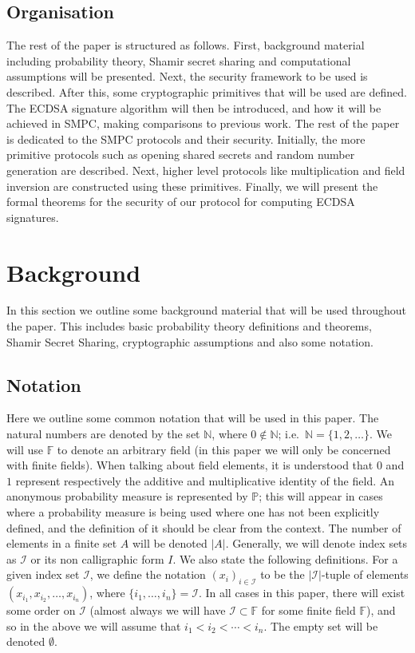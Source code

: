 \documentclass{article}
\newcommand\paper{paper}
\theoremstyle{remark}
\newcommand{\N}{\mathbb{N}}
\newcommand{\F}{\mathbb{F}}
\renewcommand{\P}{\mathbb{P}}
\begin{document}
\subsection{Organisation}

The rest of the \paper{} is structured as follows. First, background material
including probability theory, Shamir secret sharing and computational
assumptions will be presented. Next, the security framework to be used is
described. After this, some cryptographic primitives that will be used are
defined. The ECDSA signature algorithm will then be introduced, and how it will
be achieved in SMPC, making comparisons to previous work. The rest of the paper
is dedicated to the SMPC protocols and their security. Initially, the more
primitive protocols such as opening shared secrets and random number generation
are described. Next, higher level protocols like multiplication and field
inversion are constructed using these primitives. Finally, we will present the
formal theorems for the security of our protocol for computing ECDSA
signatures.

\section{Background}

In this section we outline some background material that will be used
throughout the \paper{}. This includes basic probability theory definitions and
theorems, Shamir Secret Sharing, cryptographic assumptions and also some
notation.

\subsection{Notation}

Here we outline some common notation that will be used in this \paper{}. The
natural numbers are denoted by the set $\N$, where $0 \notin \N$; i.e.\ $\N =
\{1, 2, \ldots\}$. We will use $\F$ to denote an arbitrary field (in this
\paper{} we will only be concerned with finite fields). When talking about
field elements, it is understood that $0$ and $1$ represent respectively the
additive and multiplicative identity of the field. An anonymous probability
measure is represented by $\P$; this will appear in cases where a probability
measure is being used where one has not been explicitly defined, and the
definition of it should be clear from the context. The number of elements in a
finite set $A$ will be denoted $|A|$. Generally, we will denote index sets as
$\mathcal{I}$ or its non calligraphic form $I$. We also state the following
definitions. For a given index set $\mathcal{I}$, we define the notation
${(x_i)}_{i \in \mathcal{I}}$ to be the $|\mathcal{I}|$-tuple of elements
$(x_{i_1}, x_{i_2}, \ldots, x_{i_n})$, where $\{i_1, \ldots, i_n\} =
\mathcal{I}$. In all cases in this \paper{}, there will exist some order on
$\mathcal{I}$ (almost always we will have $\mathcal{I} \subset \F$ for some
finite field $\F$), and so in the above we will assume that $i_1 < i_2 < \cdots
< i_n$. The empty set will be denoted $\emptyset$.
\end{document}
